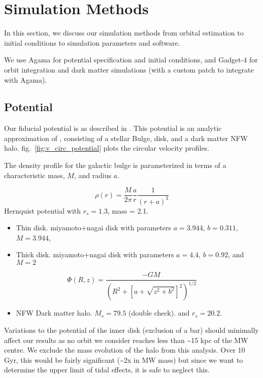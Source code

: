 \section{Simulation Methods}\label{simulation-methods}

In this section, we discuss our simulation methods from orbital
estimation to initial conditions to simulation parameters and software.

We use Agama \citep{agama} for potential specification and initial
conditions, and Gadget-4 \citep{gadget4} for orbit integration and dark
matter simulations (with a custom patch to integrate with Agama).

\subsection{Potential}\label{potential}

Our fiducial potential is as described in \citet{EP2020}. This potential
is an analytic approximation of \citet{mcmillan2011}, consisting of a
stellar Bulge, disk, and a dark matter NFW halo.
fig.~\ref{fig:v_circ_potential} plots the circular velocity profiles.

The \citet{hernquist1990} density profile for the galactic bulge is
parameterized in terms of a characteristic mass, \(M\), and radius
\(a\).

\[
\rho(r) = \frac{M}{2\pi} \frac{a}{r} \frac{1}{(r+a)^3}
\] Hernquist potential with \(r_s=1.3\), mass = 2.1.

\begin{itemize}
\tightlist
\item
  Thin disk. miyamoto+nagai disk with parameters \(a=3.944\),
  \(b=0.311\), \(M=3.944\),
\item
  Thick disk. miyamoto+nagai disk with parameters \(a=4.4\), \(b=0.92\),
  and \(M=2\)
\end{itemize}

\[
\Phi(R, z) = \frac{-GM}{\left(R^2 + \left[a + \sqrt{z^2 + b^2}\right]^{2}\right)^{1/2}}
\]

\begin{itemize}
\tightlist
\item
  NFW Dark matter halo. \(M_s=79.5\) (double check). and \(r_s = 20.2\).
\end{itemize}

Variations to the potential of the inner disk (exclusion of a bar)
should minimally affect our results as no orbit we consider reaches less
than \textasciitilde15 kpc of the MW centre. We exclude the mass
evolution of the halo from this analysis. Over 10 Gyr, this would be
fairly significant (\textasciitilde2x in MW mass) but since we want to
determine the upper limit of tidal effects, it is safe to neglect this.

